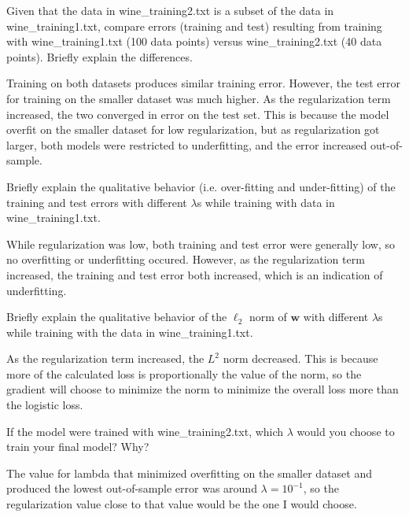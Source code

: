 \problem[4]
Given that the data in wine\_training2.txt is a subset of the data in wine\_training1.txt, compare errors (training and test) resulting from training with wine\_training1.txt (100 data points) versus wine\_training2.txt (40 data points). Briefly explain the differences.

\begin{solution}
  Training on both datasets produces similar training error. However, the test error for training on the smaller dataset was much higher. As the regularization term increased, the two converged in error on the test set. This is because the model overfit on the smaller dataset for low regularization, but as regularization got larger, both models were restricted to underfitting, and the error increased out-of-sample.
\end{solution}

\newpage

\problem[4]
Briefly explain the qualitative behavior (i.e. over-fitting and under-fitting) of the training and test errors with different $\lambda$s while training with data in wine\_training1.txt.

\begin{solution}
  While regularization was low, both training and test error were generally low, so no overfitting or underfitting occured. However, as the regularization term increased, the training and test error both increased, which is an indication of underfitting.
\end{solution}

\problem[4]
Briefly explain the qualitative behavior of the $\ell_2$ norm of $\textbf{w}$ with different $\lambda$s while training with the data in wine\_training1.txt.

\begin{solution}
  As the regularization term increased, the $L^2$ norm decreased. This is because more of the calculated loss is proportionally the value of the norm, so the gradient will choose to minimize the norm to minimize the overall loss more than the logistic loss.
\end{solution}

\problem[4]
If the model were trained with wine\_training2.txt, which $\lambda$ would you choose to train your final model? Why?

\begin{solution}
  The value for lambda that minimized overfitting on the smaller dataset and produced the lowest out-of-sample error was around $\lambda = 10^{-1}$, so the regularization value close to that value would be the one I would choose.
\end{solution}

